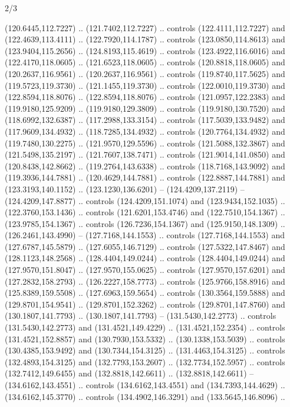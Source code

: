 \begin{flagdescription}{2/3}
\begin{scope}[xshift=0.5\flaglength,yshift=0.5\flagwidth,scale=\flagwidth/180]
\begin{scope}[y=0.8pt, x=0.8pt, yscale=-1,shift={(-168.75,-108.75)}]
  (120.6445,112.7227) .. (121.7402,112.7227) .. controls (122.4111,112.7227) and
  (122.4639,113.4111) .. (122.7920,114.1787) .. controls (123.0850,114.8613) and
  (123.9404,115.2656) .. (124.8193,115.4619) .. controls (123.4922,116.6016) and
  (122.4170,118.0605) .. (121.6523,118.0605) .. controls (120.8818,118.0605) and
  (120.2637,116.9561) .. (120.2637,116.9561) .. controls (119.8740,117.5625) and
  (119.5723,119.3730) .. (121.1455,119.3730) .. controls (122.0010,119.3730) and
  (122.8594,118.8076) .. (122.8594,118.8076) .. controls (121.0957,122.2383) and
  (119.9180,125.9209) .. (119.9180,129.3809) .. controls (119.9180,130.7520) and
  (118.6992,132.6387) .. (117.2988,133.3154) .. controls (117.5039,133.9482) and
  (117.9609,134.4932) .. (118.7285,134.4932) .. controls (120.7764,134.4932) and
  (119.7480,130.2275) .. (121.9570,129.5596) .. controls (121.5088,132.3867) and
  (121.5498,135.2197) .. (121.7607,138.7471) .. controls (121.9014,141.0850) and
  (120.8438,142.8662) .. (119.2764,143.6338) .. controls (118.7168,143.9092) and
  (119.3936,144.7881) .. (120.4629,144.7881) .. controls (122.8887,144.7881) and
  (123.3193,140.1152) .. (123.1230,136.6201) -- (124.4209,137.2119) --
  (124.4209,147.8877) .. controls (124.4209,151.1074) and (123.9434,152.1035) ..
  (122.3760,153.1436) .. controls (121.6201,153.4746) and (122.7510,154.1367) ..
  (123.9785,154.1367) .. controls (126.7236,154.1367) and (125.9150,148.1309) ..
  (126.2461,143.4990) -- (127.7168,144.1553) .. controls (127.7168,144.1553) and
  (127.6787,145.5879) .. (127.6055,146.7129) .. controls (127.5322,147.8467) and
  (128.1123,148.2568) .. (128.4404,149.0244) .. controls (128.4404,149.0244) and
  (127.9570,151.8047) .. (127.9570,155.0625) .. controls (127.9570,157.6201) and
  (127.2832,158.2793) .. (126.2227,158.7773) .. controls (125.9766,158.8916) and
  (125.8389,159.5508) .. (127.6963,159.5654) .. controls (130.3564,159.5888) and
  (129.8701,154.9541) .. (129.8701,152.3262) .. controls (129.8701,147.8760) and
  (130.1807,141.7793) .. (130.1807,141.7793) -- (131.5430,142.2773) .. controls
  (131.5430,142.2773) and (131.4521,149.4229) .. (131.4521,152.2354) .. controls
  (131.4521,152.8857) and (130.7930,153.5332) .. (130.1338,153.5039) .. controls
  (130.4385,153.9492) and (130.7344,154.3125) .. (131.4463,154.3125) .. controls
  (132.4893,154.3125) and (132.7793,153.2607) .. (132.7734,152.5957) .. controls
  (132.7412,149.6455) and (132.8818,142.6611) .. (132.8818,142.6611) --
  (134.6162,143.4551) .. controls (134.6162,143.4551) and (134.7393,144.4629) ..
  (134.6162,145.3770) .. controls (134.4902,146.3291) and (133.5645,146.8096) ..

\end{scope}
\end{scope}
\end{flagdescription}
